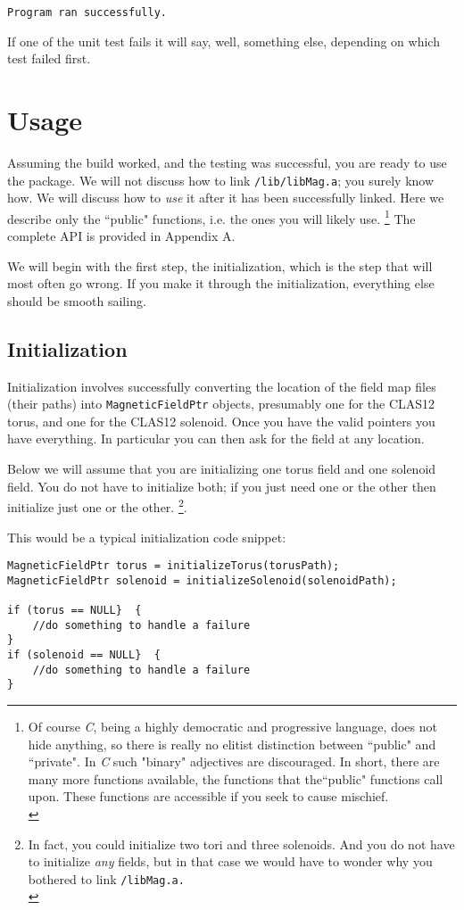 \documentclass{article}
\begin{document}
\texttt{Program ran successfully. }

If one of the unit test fails it will say, well, something else, depending on which test failed first.
\section {Usage}
Assuming the build worked, and the testing was successful, you are ready to use the package. We will not discuss how to link \texttt{/lib/libMag.a}; you surely know how. We will discuss how to \textit{use} it after it has been successfully  linked. Here we describe only the ``public" functions, i.e. the ones you will likely use. \footnote{Of course \textit{C}, being a highly democratic and progressive language, does not hide anything, so there is really no elitist distinction between ``public" and ``private".  In \textit{C} such "binary" adjectives are discouraged.  In short, there are many more functions available, the functions that the``public" functions call upon. These functions  are accessible if you seek to cause mischief.\\} The complete API is provided in Appendix A.

We will begin with the first step, the initialization, which is the step that will most often go wrong. If you make it through the initialization, everything else should be smooth sailing.
\subsection{Initialization}

Initialization involves successfully converting the location of the field map files (their paths) into  \texttt{MagneticFieldPtr} objects, presumably one for the CLAS12 torus, and one for the CLAS12 solenoid. Once you have the valid pointers you have everything. In particular you can then ask for the field at any location.

Below we will assume that you are initializing one torus field and one solenoid field. You do not have to initialize both; if you just need one or the other then initialize just one or the other. \footnote{In fact, you could initialize two tori and three solenoids. And you do not have to initialize \textit{any} fields, but in that case we would have to wonder why you bothered to link \texttt{/libMag.a.\\}}. 

This would be a typical initialization code snippet:

\begin{verbatim} 
MagneticFieldPtr torus = initializeTorus(torusPath);
MagneticFieldPtr solenoid = initializeSolenoid(solenoidPath);

if (torus == NULL}  {
    //do something to handle a failure
}
if (solenoid == NULL}  {
    //do something to handle a failure
}

\end{verbatim}
\end{document}

